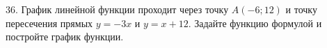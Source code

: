 36. График линейной функции проходит через точку $A(-6;12)$ и точку пересечения прямых $y=-3x$ и $y=x+12.$ Задайте функцию формулой и постройте график функции.\\
